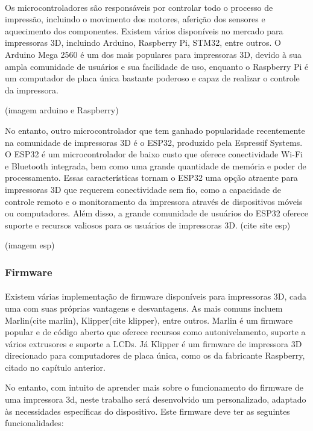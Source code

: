 \documentclass[12pt, english]{article}
\begin{document}
\paragraph{}
Os microcontroladores são responsáveis por controlar todo o processo de impressão, incluindo o movimento dos motores, aferição dos sensores e aquecimento dos componentes. Existem vários disponíveis no mercado para impressoras 3D, incluindo Arduino, Raspberry Pi, STM32, entre outros. O Arduino Mega 2560 é um dos mais populares para impressoras 3D, devido à sua ampla comunidade de usuários e sua facilidade de uso, enquanto o Raspberry Pi é um computador de placa única bastante poderoso e capaz de realizar o controle da impressora.

(imagem arduino e Raspberry)

No entanto, outro microcontrolador que tem ganhado popularidade recentemente na comunidade de impressoras 3D é o ESP32, produzido pela Espressif Systems. O ESP32 é um microcontrolador de baixo custo que oferece conectividade Wi-Fi e Bluetooth integrada, bem como uma grande quantidade de memória e poder de processamento. Essas características tornam o ESP32 uma opção atraente para impressoras 3D que requerem conectividade sem fio, como a capacidade de controle remoto e o monitoramento da impressora através de dispositivos móveis ou computadores. Além disso, a grande comunidade de usuários do ESP32 oferece suporte e recursos valiosos para os usuários de impressoras 3D. (cite site esp)

(imagem esp)

\subsubsection{Firmware}

\paragraph{}
Existem várias implementação de firmware disponíveis para impressoras 3D, cada uma com suas próprias vantagens e desvantagens. As mais comuns incluem Marlin(cite marlin), Klipper(cite klipper), entre outros. Marlin é um firmware popular e de código aberto que oferece recursos como autonivelamento, suporte a vários extrusores e suporte a LCDs. Já Klipper é um firmware de impressora 3D direcionado para computadores de placa única, como os da fabricante Raspberry, citado no capítulo anterior.

No entanto, com intuito de aprender mais sobre o funcionamento do firmware de uma impressora 3d, neste trabalho será desenvolvido um personalizado, adaptado às necessidades específicas do dispositivo. Este firmware deve ter as seguintes funcionalidades:
\end{document}
